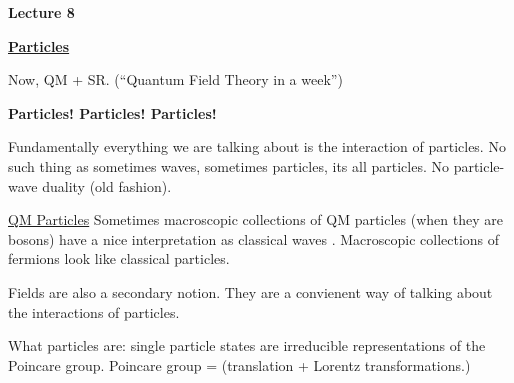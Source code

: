 
\usepackage{fancyhdr}

\fancyhf{}


\thispagestyle{fancy}

\begin{center}
{\huge \textbf{Lecture 8}}
\end{center}

{\fontsize{14}{16}\selectfont

\textbf{\underline{Particles}} 

Now, QM + SR.  (``Quantum Field Theory in a week'')

\begin{center}
\textbf{Particles! Particles! Particles! }
\end{center}


Fundamentally everything we are talking about is the interaction of particles.
No such thing as sometimes waves, sometimes particles, its all particles.
No particle-wave duality (old fashion).

\underline{QM Particles}
Sometimes macroscopic collections of QM particles (when they are bosons) have a nice interpretation as classical waves .
Macroscopic collections of fermions look like classical particles.


Fields are also a secondary notion.
They are a convienent way of talking about the interactions of particles.

What particles are:
single particle states are irreducible representations of the Poincare group. 
Poincare group = (translation + Lorentz transformations.)

}
